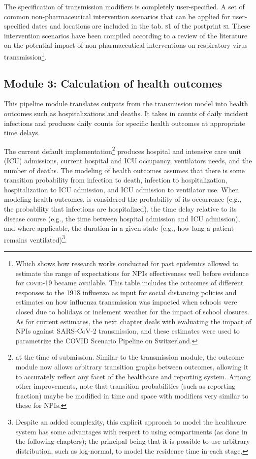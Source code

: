 {The specification of transmission modifiers is completely user-specified. A set of common non-pharmaceutical intervention scenarios that can be applied for user-specified dates and locations are included in the tab. \textsc{s1} of the postprint \textsc{si}. These intervention scenarios have been compiled according to a review of the literature on the potential impact of non-pharmaceutical interventions on respiratory virus transmission\footnote{Which shows how research works conducted for past epidemics allowed to estimate the range of expectations for NPIs effectiveness well before evidence for \textsc{covid}-19 became available. This table includes \eg the outcomes of different responses to the 1918 influenza as input for social distancing policies and estimates on how influenza transmission was impacted when schools were closed due to holidays or inclement weather for the impact of school closures. As for current estimates, the next chapter deals with evaluating the impact of NPIs against SARS-CoV-2 transmission, and these estimates were used to parametrize the COVID Scenario Pipeline on Switzerland.}.

\subsection{Module 3: Calculation of health outcomes}
This pipeline module translates outputs from the transmission model into health outcomes such as hospitalizations and deaths. It takes in counts of daily incident infections and produces daily counts for specific health outcomes at appropriate time delays.

The current default implementation\footnote{at the time of submission. Similar to the transmission module, the outcome module now allows arbitrary transition graphs between outcomes, allowing it to accurately reflect any facet of the healthcare and reporting system. Among other improvements, note that transition probabilities (such as reporting fraction) maybe be modified in time and space with modifiers very similar to these for NPIs.} produces hospital and intensive care unit (ICU) admissions, current hospital and ICU occupancy, ventilators needs, and the number of deaths. The modeling of health outcomes assumes that there is some transition probability from infection to death, infection to hospitalization, hospitalization to ICU admission, and ICU admission to ventilator use. When modeling health outcomes, is considered the probability of its occurrence (e.g., the probability that infections are hospitalized), the time delay relative to its disease course (e.g., the time between hospital admission and ICU admission), and where applicable, the duration in a given state (e.g., how long a patient remains ventilated)\footnote{Despite an added complexity, this explicit approach to model the healthcare system has some advantages with respect to using compartments (as done in the following chapters); the principal being that it is possible to use arbitrary distribution,  such as log-normal, to model the residence time in each stage.}.

}
